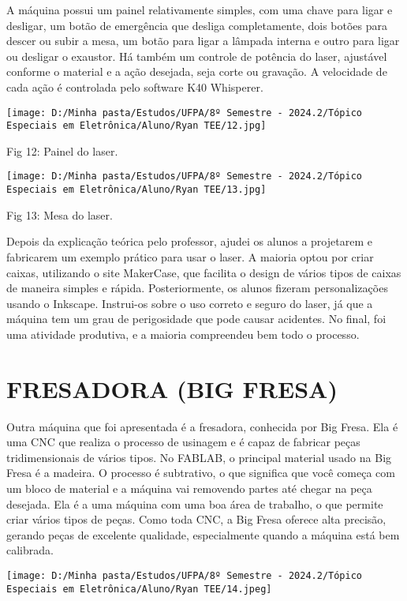 \documentclass[
]{book}
\begin{document}
A máquina possui um painel relativamente simples, com uma chave para ligar e desligar, um botão de emergência que desliga completamente, dois botões para descer ou subir a mesa, um botão para ligar a lâmpada interna e outro para ligar ou desligar o exaustor. Há também um controle de potência do laser, ajustável conforme o material e a ação desejada, seja corte ou gravação. A velocidade de cada ação é controlada pelo software K40 Whisperer.

\texttt{[image: D:/Minha pasta/Estudos/UFPA/8º Semestre - 2024.2/Tópico Especiais em Eletrônica/Aluno/Ryan TEE/12.jpg]}

Fig 12: Painel do laser.

\texttt{[image: D:/Minha pasta/Estudos/UFPA/8º Semestre - 2024.2/Tópico Especiais em Eletrônica/Aluno/Ryan TEE/13.jpg]}

Fig 13: Mesa do laser.

Depois da explicação teórica pelo professor, ajudei os alunos a projetarem e fabricarem um exemplo prático para usar o laser. A maioria optou por criar caixas, utilizando o site MakerCase, que facilita o design de vários tipos de caixas de maneira simples e rápida. Posteriormente, os alunos fizeram personalizações usando o Inkscape. Instrui-os sobre o uso correto e seguro do laser, já que a máquina tem um grau de perigosidade que pode causar acidentes. No final, foi uma atividade produtiva, e a maioria compreendeu bem todo o processo.

\chapter{FRESADORA (BIG FRESA)}\label{fresadora-big-fresa}

Outra máquina que foi apresentada é a fresadora, conhecida por Big Fresa. Ela é uma CNC que realiza o processo de usinagem e é capaz de fabricar peças tridimensionais de vários tipos. No FABLAB, o principal material usado na Big Fresa é a madeira. O processo é subtrativo, o que significa que você começa com um bloco de material e a máquina vai removendo partes até chegar na peça desejada. Ela é a uma máquina com uma boa área de trabalho, o que permite criar vários tipos de peças. Como toda CNC, a Big Fresa oferece alta precisão, gerando peças de excelente qualidade, especialmente quando a máquina está bem calibrada.

\texttt{[image: D:/Minha pasta/Estudos/UFPA/8º Semestre - 2024.2/Tópico Especiais em Eletrônica/Aluno/Ryan TEE/14.jpeg]}
\end{document}
